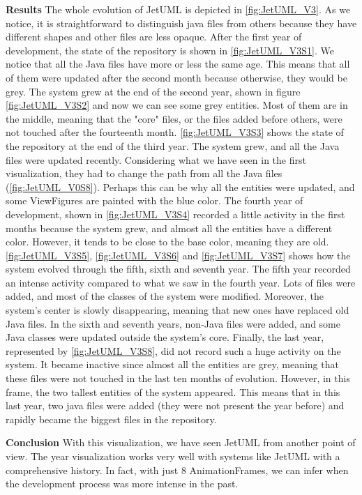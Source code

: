 \textbf{Results}
The whole evolution of JetUML is depicted in \autoref{fig:JetUML_V3}. As we notice, it is straightforward to distinguish java files from others because they have different shapes and other files are less opaque. After the first year of development, the state of the repository is shown in \autoref{fig:JetUML_V3S1}. We notice that all the Java files have more or less the same age. This means that all of them were updated after the second month because otherwise, they would be grey. The system grew at the end of the second year, shown in figure \autoref{fig:JetUML_V3S2} and now we can see some grey entities. Most of them are in the middle, meaning that the "core" files, or the files added before others, were not touched after the fourteenth month.  \autoref{fig:JetUML_V3S3} shows the state of the repository at the end of the third year. The system grew, and all the Java files were updated recently. Considering what we have seen in the first visualization, they had to change the path from all the Java files (\autoref{fig:JetUML_V0S8}). Perhaps this can be why all the entities were updated, and some ViewFigures are painted with the blue color. The fourth year of development, shown in  \autoref{fig:JetUML_V3S4} recorded a little activity in the first months because the system grew, and almost all the entities have a different color. However, it tends to be close to the base color, meaning they are old. 
\autoref{fig:JetUML_V3S5},  \autoref{fig:JetUML_V3S6} and  \autoref{fig:JetUML_V3S7} shows how the system evolved through the fifth, sixth and seventh year. The fifth year recorded an intense activity compared to what we saw in the fourth year. Lots of files were added, and most of the classes of the system were modified. Moreover, the system's center is slowly disappearing, meaning that new ones have replaced old Java files. In the sixth and seventh years, non-Java files were added, and some Java classes were updated outside the system's core. Finally, the last year, represented by \autoref{fig:JetUML_V3S8}, did not record such a huge activity on the system. It became inactive since almost all the entities are grey, meaning that these files were not touched in the last ten months of evolution. However, in this frame, the two tallest entities of the system appeared. This means that in this last year, two java files were added (they were not present the year before) and rapidly became the biggest files in the repository.  

\textbf{Conclusion}
With this visualization, we have seen JetUML from another point of view. The year visualization works very well with systems like JetUML with a comprehensive history. In fact, with just 8 AnimationFrames, we can infer when the development process was more intense in the past. 

